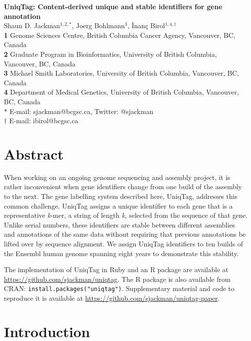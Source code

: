 \documentclass[10pt]{article}
\date{}
\begin{document}
\begin{flushleft}
{\large
\textbf{UniqTag: Content-derived unique and stable identifiers for gene annotation}
}
\\
Shaun D. Jackman$^{1,2,\ast}$,
Joerg Bohlmann$^{3}$,
\.{I}nan\c{c} Birol$^{1,4,\dagger}$
\\ \textbf{1} Genome Sciences Centre, British Columbia Cancer Agency, Vancouver, BC, Canada
\\ \textbf{2} Graduate Program in Bioinformatics, University of British Columbia, Vancouver, BC, Canada
\\ \textbf{3} Michael Smith Laboratories, University of British Columbia, Vancouver, BC, Canada
\\ \textbf{4} Department of Medical Genetics, University of British Columbia, Vancouver, BC, Canada
\\ $\ast$ E-mail: sjackman@bcgsc.ca, Twitter: @sjackman
\\ $\dagger$ E-mail: ibirol@bcgsc.ca
\end{flushleft}
\section{Abstract}\label{abstract}

When working on an ongoing genome sequencing and assembly project, it is
rather inconvenient when gene identifiers change from one build of the
assembly to the next. The gene labelling system described here, UniqTag,
addresses this common challenge. UniqTag assigns a unique identifier to
each gene that is a representative \emph{k}-mer, a string of length
\emph{k}, selected from the sequence of that gene. Unlike serial
numbers, these identifiers are stable between different assemblies and
annotations of the same data without requiring that previous annotations
be lifted over by sequence alignment. We assign UniqTag identifiers to
ten builds of the Ensembl human genome spanning eight years to
demonstrate this stability.

The implementation of UniqTag in Ruby and an R package are available at
\url{https://github.com/sjackman/uniqtag}. The R package is also
available from CRAN: \texttt{install.packages("uniqtag")}. Supplementary
material and code to reproduce it is available at
\url{https://github.com/sjackman/uniqtag-paper}.

\section{Introduction}\label{introduction}
\end{document}
